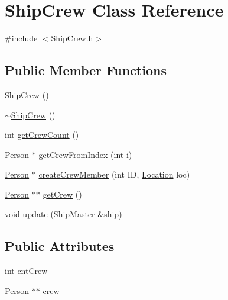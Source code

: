 \hypertarget{classShipCrew}{\section{Ship\-Crew Class Reference}
\label{classShipCrew}
}


{\ttfamily \#include $<$Ship\-Crew.\-h$>$}

\subsection*{Public Member Functions}
\begin{DoxyCompactItemize}
\item 
\hyperlink{classShipCrew_a09256cf7b653e02e695947aa6a502021}{Ship\-Crew} ()
\item 
\hyperlink{classShipCrew_a8103bf86507ab0a53144cc130ea7017a}{$\sim$\-Ship\-Crew} ()
\item 
int \hyperlink{classShipCrew_adfcbfe662d0d9eafc7377c3e57848ca5}{get\-Crew\-Count} ()
\item 
\hyperlink{classPerson}{Person} $\ast$ \hyperlink{classShipCrew_a030e3995d99e3c8ca05595ecb6803ee9}{get\-Crew\-From\-Index} (int i)
\item 
\hyperlink{classPerson}{Person} $\ast$ \hyperlink{classShipCrew_a4eda642a62a32bf2e673e40adf3b4961}{create\-Crew\-Member} (int I\-D, \hyperlink{structLocation}{Location} loc)
\item 
\hyperlink{classPerson}{Person} $\ast$$\ast$ \hyperlink{classShipCrew_a70e2c2aacf48a0a673e167531f0c4f7e}{get\-Crew} ()
\item 
void \hyperlink{classShipCrew_ada9b840371438fccc3fa7b5023e1ff46}{update} (\hyperlink{classShipMaster}{Ship\-Master} \&ship)
\end{DoxyCompactItemize}
\subsection*{Public Attributes}
\begin{DoxyCompactItemize}
\item 
int \hyperlink{classShipCrew_acb418bcac20c237b52e992950480ced3}{cnt\-Crew}
\item 
\hyperlink{classPerson}{Person} $\ast$$\ast$ \hyperlink{classShipCrew_add436cb1633b1163196048997c525083}{crew}
\end{DoxyCompactItemize}


